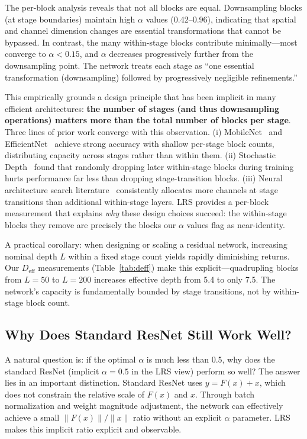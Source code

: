 \documentclass[preprint,12pt]{elsarticle}
\begin{document}
The per-block analysis reveals that not all blocks are equal. Downsampling blocks (at stage boundaries) maintain high $\alpha$ values (0.42--0.96), indicating that spatial and channel dimension changes are essential transformations that cannot be bypassed. In contrast, the many within-stage blocks contribute minimally---most converge to $\alpha < 0.15$, and $\alpha$ decreases progressively further from the downsampling point. The network treats each stage as ``one essential transformation (downsampling) followed by progressively negligible refinements.''

This empirically grounds a design principle that has been implicit in many efficient architectures: \textbf{the number of stages (and thus downsampling operations) matters more than the total number of blocks per stage}. Three lines of prior work converge with this observation. (i) MobileNet~\cite{howard2017mobilenets} and EfficientNet~\cite{tan2019efficientnet} achieve strong accuracy with shallow per-stage block counts, distributing capacity across stages rather than within them. (ii) Stochastic Depth~\cite{huang2016deep} found that randomly dropping later within-stage blocks during training hurts performance far less than dropping stage-transition blocks. (iii) Neural architecture search literature~\cite{tan2019efficientnet} consistently allocates more channels at stage transitions than additional within-stage layers. LRS provides a per-block measurement that explains \emph{why} these design choices succeed: the within-stage blocks they remove are precisely the blocks our $\alpha$ values flag as near-identity.

A practical corollary: when designing or scaling a residual network, increasing nominal depth $L$ within a fixed stage count yields rapidly diminishing returns. Our $D_\text{eff}$ measurements (Table~\ref{tab:deff}) make this explicit---quadrupling blocks from $L{=}50$ to $L{=}200$ increases effective depth from 5.4 to only 7.5. The network's capacity is fundamentally bounded by stage transitions, not by within-stage block count.

\subsection{Why Does Standard ResNet Still Work Well?}

A natural question is: if the optimal $\alpha$ is much less than 0.5, why does the standard ResNet (implicit $\alpha = 0.5$ in the LRS view) perform so well? The answer lies in an important distinction. Standard ResNet uses $y = F(x) + x$, which does not constrain the relative scale of $F(x)$ and $x$. Through batch normalization and weight magnitude adjustment, the network can effectively achieve a small $\|F(x)\|/\|x\|$ ratio without an explicit $\alpha$ parameter. LRS makes this implicit ratio explicit and observable.
\end{document}
